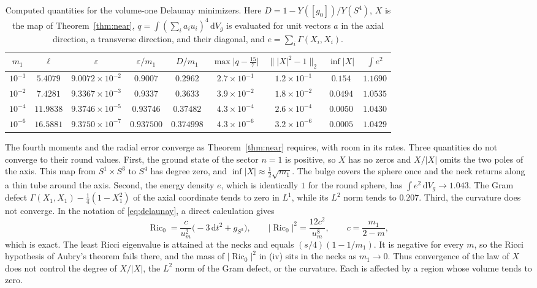 \documentclass[11pt]{article}
\numberwithin{equation}{section}
\DeclareMathOperator{\Ric}{Ric}
\newcommand{\dd}{\mathrm{d}}
\newcommand{\e}{\varepsilon}
\newcommand{\Sphere}{S^4}
\newcommand{\abs}[1]{\lvert #1\rvert}
\newcommand{\norm}[1]{\lVert #1\rVert}
\newcommand{\dv}{\dd V_g}
\begin{document}
\begin{table}[ht]
\centering\small
\setlength{\tabcolsep}{5pt}
\begin{tabular}{ccccccccc}
\hline
\(m_1\) & \(\ell\) & \(\e\) & \(\e/m_1\) & \(D/m_1\)
 & \(\max\abs{q-\tfrac{15}{7}}\) & \(\norm{\abs X^2-1}_2\)
 & \(\inf\abs X\) & \(\int e^2\)\\
\hline
\(10^{-1}\) & \(5.4079\) & \(9.0072\times10^{-2}\) & \(0.9007\) & \(0.2962\)
 & \(2.7\times10^{-1}\) & \(1.2\times10^{-1}\) & \(0.154\) & \(1.1690\)\\
\(10^{-2}\) & \(7.4281\) & \(9.3367\times10^{-3}\) & \(0.9337\) & \(0.3633\)
 & \(3.9\times10^{-2}\) & \(1.8\times10^{-2}\) & \(0.0494\) & \(1.0535\)\\
\(10^{-4}\) & \(11.9838\) & \(9.3746\times10^{-5}\) & \(0.93746\) & \(0.37482\)
 & \(4.3\times10^{-4}\) & \(2.6\times10^{-4}\) & \(0.0050\) & \(1.0430\)\\
\(10^{-6}\) & \(16.5881\) & \(9.3750\times10^{-7}\) & \(0.937500\) & \(0.374998\)
 & \(4.3\times10^{-6}\) & \(3.2\times10^{-6}\) & \(0.0005\) & \(1.0429\)\\
\hline
\end{tabular}
\caption{Computed quantities for the volume-one Delaunay minimizers.
Here \(D=1-Y([g_0])/Y(\Sphere)\), \(X\) is the map of
Theorem~\ref{thm:near}, \(q=\int(\sum_ia_iu_i)^4\,\dv\) is evaluated
for unit vectors \(a\) in the axial direction, a transverse direction,
and their diagonal, and \(e=\sum_i\Gamma(X_i,X_i)\).}
\label{tab:necklace}
\end{table}

The fourth moments and the radial error converge as
Theorem~\ref{thm:near} requires, with room in its rates. Three
quantities do not converge to their round values. First, the ground
state of the sector \(n=1\) is positive, so \(X\) has no zeros and
\(X/\abs X\) omits the two poles of the axis. This map from
\(S^1\times S^3\) to \(S^4\) has degree zero, and
\(\inf\abs X\approx\tfrac12\sqrt{m_1}\). The bulge covers the sphere
once and the neck returns along a thin tube around the axis. Second,
the energy density \(e\), which is identically \(1\) for the round
sphere, has \(\int e^2\,\dv\to1.043\). The Gram defect
\(\Gamma(X_1,X_1)-\tfrac14(1-X_1^2)\) of the axial coordinate tends to
zero in \(L^1\), while its \(L^2\) norm tends to \(0.207\). Third, the
curvature does not converge. In the notation of \eqref{eq:delaunay},
a direct calculation gives
\begin{equation}\label{eq:necklace-ricci}
 \Ric_0=\frac{c}{u_m^2}\bigl(-3\,\dd t^2+g_{S^3}\bigr),\qquad
 \abs{\Ric_0}^2=\frac{12c^2}{u_m^8},\qquad c=\frac{m_1}{2-m},
\end{equation}
which is exact. The least Ricci eigenvalue is attained at the necks
and equals \((s/4)(1-1/m_1)\). It is negative for every \(m\), so the
Ricci hypothesis of Aubry's theorem fails there, and the mass of
\(\abs{\Ric_0}^2\) in (iv) sits in the necks as \(m_1\to0\). Thus
convergence of the law of \(X\) does not
control the degree of \(X/\abs X\), the \(L^2\) norm of the Gram
defect, or the curvature. Each is affected by a region whose volume
tends to zero.
\end{document}
